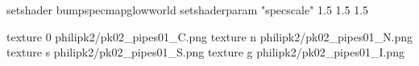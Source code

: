 setshader bumpspecmapglowworld
setshaderparam "specscale" 1.5 1.5 1.5


texture 0 philipk2/pk02_pipes01_C.png
texture n philipk2/pk02_pipes01_N.png
texture s philipk2/pk02_pipes01_S.png
texture g philipk2/pk02_pipes01_I.png

